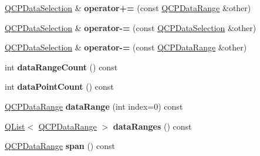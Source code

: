 \begin{DoxyCompactItemize}
\item 
\hyperlink{class_q_c_p_data_selection}{Q\+C\+P\+Data\+Selection} \& {\bfseries operator+=} (const \hyperlink{class_q_c_p_data_range}{Q\+C\+P\+Data\+Range} \&other)\hypertarget{class_q_c_p_data_selection_a041a5aee161401628779b206891322ff}{}\label{class_q_c_p_data_selection_a041a5aee161401628779b206891322ff}

\item 
\hyperlink{class_q_c_p_data_selection}{Q\+C\+P\+Data\+Selection} \& {\bfseries operator-\/=} (const \hyperlink{class_q_c_p_data_selection}{Q\+C\+P\+Data\+Selection} \&other)\hypertarget{class_q_c_p_data_selection_afbfd6dc65d809ad0e8517f25ee616baa}{}\label{class_q_c_p_data_selection_afbfd6dc65d809ad0e8517f25ee616baa}

\item 
\hyperlink{class_q_c_p_data_selection}{Q\+C\+P\+Data\+Selection} \& {\bfseries operator-\/=} (const \hyperlink{class_q_c_p_data_range}{Q\+C\+P\+Data\+Range} \&other)\hypertarget{class_q_c_p_data_selection_a2c57c281b54040a0a342b41f2f5b2e94}{}\label{class_q_c_p_data_selection_a2c57c281b54040a0a342b41f2f5b2e94}

\item 
int {\bfseries data\+Range\+Count} () const \hypertarget{class_q_c_p_data_selection_a7edbfbaf77e22f70216749e73818e247}{}\label{class_q_c_p_data_selection_a7edbfbaf77e22f70216749e73818e247}

\item 
int {\bfseries data\+Point\+Count} () const \hypertarget{class_q_c_p_data_selection_a492de1528df9cc6a73fd2883fe5b47b9}{}\label{class_q_c_p_data_selection_a492de1528df9cc6a73fd2883fe5b47b9}

\item 
\hyperlink{class_q_c_p_data_range}{Q\+C\+P\+Data\+Range} {\bfseries data\+Range} (int index=0) const \hypertarget{class_q_c_p_data_selection_a6a9c39a2019cd6d2fdd329f415262b34}{}\label{class_q_c_p_data_selection_a6a9c39a2019cd6d2fdd329f415262b34}

\item 
\hyperlink{class_q_list}{Q\+List}$<$ \hyperlink{class_q_c_p_data_range}{Q\+C\+P\+Data\+Range} $>$ {\bfseries data\+Ranges} () const \hypertarget{class_q_c_p_data_selection_aa423c27b14b400d52772d44a4fc6218f}{}\label{class_q_c_p_data_selection_aa423c27b14b400d52772d44a4fc6218f}

\item 
\hyperlink{class_q_c_p_data_range}{Q\+C\+P\+Data\+Range} {\bfseries span} () const \hypertarget{class_q_c_p_data_selection_a28057205d0b066f96b26bed79184b32b}{}\label{class_q_c_p_data_selection_a28057205d0b066f96b26bed79184b32b}


\end{DoxyCompactItemize}
